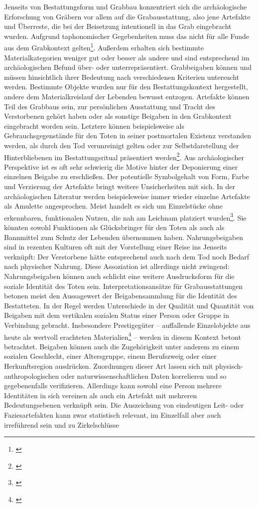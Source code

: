 \documentclass[openany,twoside,twocolumn]{book}
\let\rmarkdownfootnote\footnote%
\def\footnote{\protect\rmarkdownfootnote}
\begin{document}
Jenseits von Bestattungsform und Grabbau konzentriert sich die archäologische Erforschung von Gräbern vor allem auf die Grabausstattung, also jene Artefakte und Überreste, die bei der Beisetzung intentionell in das Grab eingebracht wurden. Aufgrund taphonomischer Gegebenheiten muss das nicht für alle Funde aus dem Grabkontext gelten\footnote{\textcite{ravn_use_2000}}. Außerdem erhalten sich bestimmte Materialkategorien weniger gut oder besser als andere und sind entsprechend im archäologischen Befund über- oder unterrepräsentiert. Grabbeigaben können und müssen hinsichtlich ihrer Bedeutung nach verschiedenen Kriterien untersucht werden. Bestimmte Objekte wurden nur für den Bestattungskontext hergestellt, andere dem Materialkreislauf der Lebenden bewusst entzogen. Artefakte können Teil des Grabbaus sein, zur persönlichen Ausstattung und Tracht des Verstorbenen gehört haben oder als sonstige Beigaben in den Grabkontext eingebracht worden sein. Letztere können beispielsweise als Gebrauchsgegenstände für den Toten in seiner postmortalen Existenz verstanden werden, als durch den Tod verunreinigt gelten oder zur Selbstdarstellung der Hinterbliebenen im Bestattungsritual präsentiert werden\footnote{\textcite{harke_beigabensitte_2003}}. Aus archäologischer Perspektive ist es oft sehr schwierig die Motive hinter der Deponierung einer einzelnen Beigabe zu erschließen. Der potentielle Symbolgehalt von Form, Farbe und Verzierung der Artefakte bringt weitere Unsicherheiten mit sich. In der archäologischen Literatur werden beispielsweise immer wieder einzelne Artefakte als Amulette angesprochen. Meist handelt es sich um Einzelstücke ohne erkennbaren, funktionalen Nutzen, die nah am Leichnam platziert wurden\footnote{\textcite{thrane_stichwort_1973}}. Sie könnten sowohl Funktionen als Glücksbringer für den Toten als auch als Bannmittel zum Schutz der Lebenden übernommen haben. Nahrungsbeigaben sind in rezenten Kulturen oft mit der Vorstellung einer Reise ins Jenseits verknüpft: Der Verstorbene hätte entsprechend auch nach dem Tod noch Bedarf nach physischer Nahrung. Diese Assoziation ist allerdings nicht zwingend: Nahrungsbeigaben können auch schlicht eine weitere Ausdrucksform für die soziale Identität des Toten sein. Interpretationsansätze für Grabausstattungen betonen meist den Aussagewert der Beigabensammlung für die Identität des Bestatteten. In der Regel werden Unterschiede in der Qualität und Quantität von Beigaben mit dem vertikalen sozialen Status einer Person oder Gruppe in Verbindung gebracht. Insbesondere Prestigegüter -- auffallende Einzelobjekte aus heute als wertvoll erachteten Materialien\footnote{\textcite{bernbeck_prestige_1996}} -- werden in diesem Kontext betont betrachtet. Beigaben können auch die Zugehörigkeit unter anderem zu einem sozialen Geschlecht, einer Altersgruppe, einem Berufszweig oder einer Herkunftsregion ausdrücken. Zuordnungen dieser Art lassen sich mit physisch-anthropologischen oder naturwissenschaftlichen Daten korrelieren und so gegebenenfalls verifizieren. Allerdings kann sowohl eine Person mehrere Identitäten in sich vereinen als auch ein Artefakt mit mehreren Bedeutungsebenen verknüpft sein. Die Auszeichung von eindeutigen Leit- oder Faziesartefakten kann zwar statistisch relevant, im Einzelfall aber auch irreführend sein und zu Zirkelschlüsse 
\end{document}
